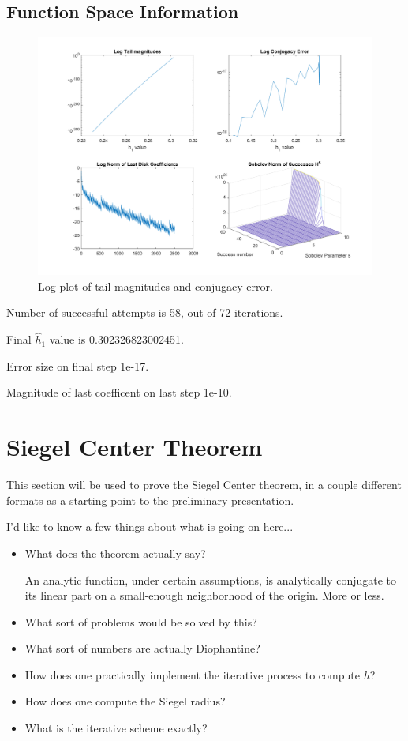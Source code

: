 \documentclass{article}
\theoremstyle{plain}
\theoremstyle{remark}
\begin{document}
\subsection{Function Space Information}
\begin{figure}[h!]
\centering
\includegraphics[scale=.4]{siegel_disk_defect}
\caption{Log plot of tail magnitudes and conjugacy error.}
\end{figure}

\noindent
Number of successful attempts is 58, out of 72 iterations. 

\noindent
Final $\hat{h}_1$ value is 0.302326823002451.

\noindent
Error size on final step 1e-17.

\noindent
Magnitude of last coefficent on last step 1e-10.


\section{Siegel Center Theorem}

This section will be used to prove the Siegel Center theorem, in a couple different formats as a starting point to the preliminary presentation.

I'd like to know a few things about what is going on here...
\begin{itemize}
\item What does the theorem actually say?

An analytic function, under certain assumptions, is analytically conjugate to its linear part on a small-enough neighborhood of the origin. More or less.

\item What sort of problems would be solved by this?
\item What  sort of numbers are actually Diophantine?
\item How does one practically implement the iterative process to compute $h$?
\item How does one compute the Siegel radius?
\item What is the iterative scheme exactly?
\end{itemize}
\end{document}
